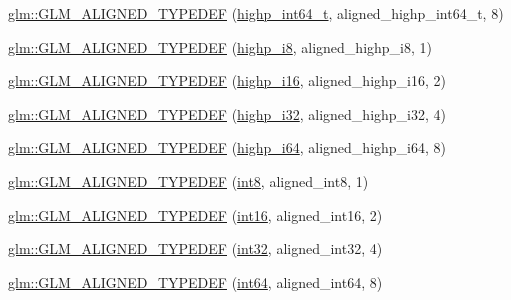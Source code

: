 \begin{DoxyCompactItemize}
\hyperlink{group__gtx__type__aligned_ga790cfff1ca39d0ed696ffed980809311}{glm\+::\+G\+L\+M\+\_\+\+A\+L\+I\+G\+N\+E\+D\+\_\+\+T\+Y\+P\+E\+D\+EF} (\hyperlink{group__gtc__type__precision_ga0f5186bde44471133b08057cae8a51ac}{highp\+\_\+int64\+\_\+t}, aligned\+\_\+highp\+\_\+int64\+\_\+t, 8)
\item 
\hyperlink{group__gtx__type__aligned_ga8265b91eb23c120a9b0c3e381bc37b96}{glm\+::\+G\+L\+M\+\_\+\+A\+L\+I\+G\+N\+E\+D\+\_\+\+T\+Y\+P\+E\+D\+EF} (\hyperlink{group__gtc__type__precision_ga8b9eb0b24cce7f14478bfcacb53ce839}{highp\+\_\+i8}, aligned\+\_\+highp\+\_\+i8, 1)
\item 
\hyperlink{group__gtx__type__aligned_gae6d384de17588d8edb894fbe06e0d410}{glm\+::\+G\+L\+M\+\_\+\+A\+L\+I\+G\+N\+E\+D\+\_\+\+T\+Y\+P\+E\+D\+EF} (\hyperlink{group__gtc__type__precision_gaa04399853952dbce29cb62e2432f350a}{highp\+\_\+i16}, aligned\+\_\+highp\+\_\+i16, 2)
\item 
\hyperlink{group__gtx__type__aligned_ga9c8172b745ee03fc5b2b91c350c2922f}{glm\+::\+G\+L\+M\+\_\+\+A\+L\+I\+G\+N\+E\+D\+\_\+\+T\+Y\+P\+E\+D\+EF} (\hyperlink{group__gtc__type__precision_ga197d19b585222da57d70238a5cfc2be8}{highp\+\_\+i32}, aligned\+\_\+highp\+\_\+i32, 4)
\item 
\hyperlink{group__gtx__type__aligned_ga77e0dff12aa4020ddc3f8cabbea7b2e6}{glm\+::\+G\+L\+M\+\_\+\+A\+L\+I\+G\+N\+E\+D\+\_\+\+T\+Y\+P\+E\+D\+EF} (\hyperlink{group__gtc__type__precision_gad3cb9a0ac0266ea2c51c6fac256345d1}{highp\+\_\+i64}, aligned\+\_\+highp\+\_\+i64, 8)
\item 
\hyperlink{group__gtx__type__aligned_gabd82b9faa9d4d618dbbe0fc8a1efee63}{glm\+::\+G\+L\+M\+\_\+\+A\+L\+I\+G\+N\+E\+D\+\_\+\+T\+Y\+P\+E\+D\+EF} (\hyperlink{group__gtc__type__precision_ga96254f9c1c4506fc8eb5cf3301ce8565}{int8}, aligned\+\_\+int8, 1)
\item 
\hyperlink{group__gtx__type__aligned_ga285649744560be21000cfd81bbb5d507}{glm\+::\+G\+L\+M\+\_\+\+A\+L\+I\+G\+N\+E\+D\+\_\+\+T\+Y\+P\+E\+D\+EF} (\hyperlink{group__gtc__type__precision_ga2945a61d12771f8954994fcddf02b021}{int16}, aligned\+\_\+int16, 2)
\item 
\hyperlink{group__gtx__type__aligned_ga07732da630b2deda428ce95c0ecaf3ff}{glm\+::\+G\+L\+M\+\_\+\+A\+L\+I\+G\+N\+E\+D\+\_\+\+T\+Y\+P\+E\+D\+EF} (\hyperlink{group__gtc__type__precision_ga632d8b25f6b61659f39ea4321fab92a4}{int32}, aligned\+\_\+int32, 4)
\item 
\hyperlink{group__gtx__type__aligned_ga1a8da2a8c51f69c07a2e7f473aa420f4}{glm\+::\+G\+L\+M\+\_\+\+A\+L\+I\+G\+N\+E\+D\+\_\+\+T\+Y\+P\+E\+D\+EF} (\hyperlink{group__gtc__type__precision_ga435d75819cce297cc5fa21bd84ef89a5}{int64}, aligned\+\_\+int64, 8)

\end{DoxyCompactItemize}

